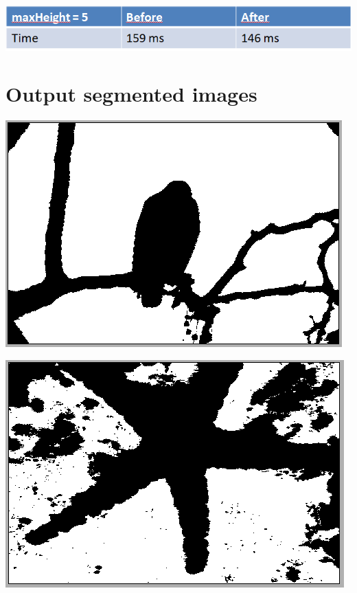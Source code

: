 \documentclass{article}
\begin{document}
\begin{center}
\includegraphics[scale=0.6]{pics/countactive.PNG} 
\end{center}

\section{Output segmented images}

\begin{center}
\includegraphics[scale=0.6]{pics/eagle_segmented.PNG} 
\end{center}

\begin{center}
\includegraphics[scale=0.6]{pics/height 5.PNG} 
\end{center}
\end{document}
